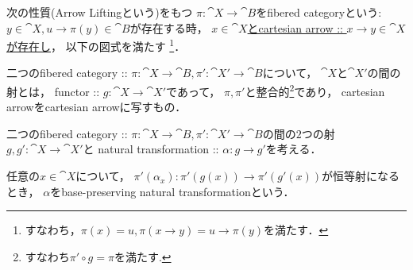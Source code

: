 \documentclass[a4paper, dvipdfmx]{jsarticle}
\begin{document}
\begin{Def}
\begin{myenum}
\item
    次の性質(Arrow Liftingという)をもつ
    $\pi \colon \cat{X} \to \cat{B}$をfibered categoryという:
    $y \in \cat{X}, u \to \pi(y) \in \cat{B}$が存在する時，
    \underline{$x \in \cat{X}$とcartesian arrow :: $x \to y \in \cat{X}$が存在し}，
    以下の図式を満たす
    \footnote{すなわち，$\pi(x)=u, \pi(x \to y)=u \to \pi(y)$を満たす．}．
    \begin{center}
    \end{center}

\item
    二つのfibered category :: 
    $\pi \colon \cat{X} \to \cat{B}, \pi' \colon \cat{X}' \to \cat{B}$について，
    $\cat{X}$と$\cat{X}'$の間の射とは，
    functor :: $g \colon \cat{X} \to \cat{X}'$であって，
    $\pi, \pi'$と整合的\footnote{ すなわち$\pi' \circ g=\pi$を満たす. }であり，
    cartesian arrowをcartesian arrowに写すもの．

\item
    二つのfibered category :: 
    $\pi \colon \cat{X} \to \cat{B}, \pi' \colon \cat{X}' \to \cat{B}$の間の$2$つの射
    $g,g' \colon \cat{X} \to \cat{X}'$と
    natural transformation :: $\alpha \colon g \to g'$を考える．
    \begin{center}
    \end{center}
    任意の$x \in \cat{X}$について，
    $\pi'(\alpha_x) \colon \pi'(g(x)) \to \pi'(g'(x))$が恒等射になるとき，
    $\alpha$をbase-preserving natural transformationという．
\end{myenum}
\end{Def}
\end{document}
